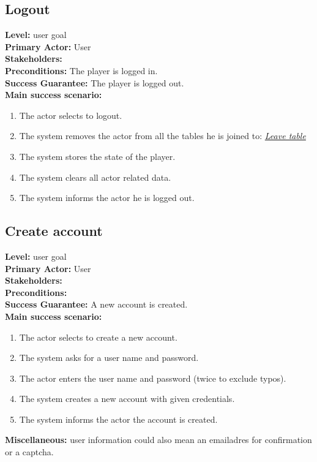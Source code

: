 \documentclass[a4paper,11pt]{report}
\begin{document}
\subsection{Logout}
\textbf{Level:} user goal \\
\textbf{Primary Actor:} User \\
\textbf{Stakeholders:} \\
\textbf{Preconditions:} The player is logged in. \\
\textbf{Success Guarantee:} The player is logged out.\\
\textbf{Main success scenario:} 
\begin{enumerate}
\item The actor selects to logout. 
\item The system removes the actor from all the tables he is joined to: \emph{\underline{Leave table}}
\item The system stores the state of the player.
\item The system clears all actor related data. 
\item The system informs the actor he is logged out. 
\end{enumerate}

\subsection{Create account}
\textbf{Level:} user goal \\
\textbf{Primary Actor:} User \\
\textbf{Stakeholders:} \\
\textbf{Preconditions:} \\
\textbf{Success Guarantee:} A new account is created. \\
\textbf{Main success scenario:} 
\begin{enumerate}
\item The actor selects to create a new account. 
\item The system asks for a user name and password.
\item The actor enters the user name and password (twice to exclude typos).
\item The system creates a new account with given credentials. 
\item The system informs the actor the account is created.
\end{enumerate}
\textbf{Miscellaneous:} user information could also mean an emailadres for confirmation or a captcha.
\end{document}
